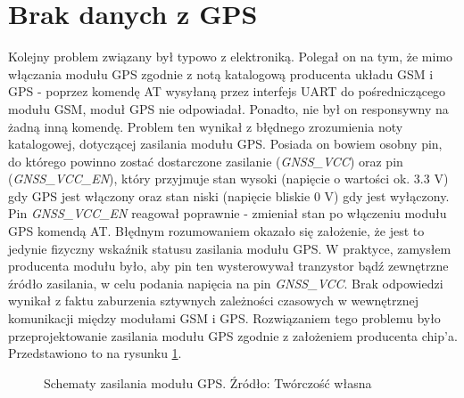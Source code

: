 \section{Brak danych z GPS}

Kolejny problem związany był typowo z elektroniką. Polegał on na tym, że mimo włączania modułu GPS zgodnie z notą katalogową producenta układu GSM i GPS - poprzez komendę AT wysyłaną przez interfejs UART do pośredniczącego modułu GSM, moduł GPS nie odpowiadał. Ponadto, nie był on responsywny na żadną inną komendę. Problem ten wynikał z błędnego zrozumienia noty katalogowej, dotyczącej zasilania modułu GPS. Posiada on bowiem osobny pin, do którego powinno zostać dostarczone zasilanie (\textit{GNSS\_VCC}) oraz pin (\textit{GNSS\_VCC\_EN}), który przyjmuje stan wysoki (napięcie o wartości ok. 3.3 V) gdy GPS jest włączony oraz stan niski (napięcie bliskie 0 V) gdy jest wyłączony. Pin \textit{GNSS\_VCC\_EN} reagował poprawnie - zmieniał stan po włączeniu modułu GPS komendą AT. Błędnym rozumowaniem okazało się założenie, że jest to jedynie fizyczny wskaźnik statusu zasilania modułu GPS. W praktyce, zamysłem producenta modułu było, aby pin ten wysterowywał tranzystor bądź zewnętrzne źródło zasilania, w celu podania napięcia na pin \textit{GNSS\_VCC}. Brak odpowiedzi wynikał z faktu zaburzenia sztywnych zależności czasowych w wewnętrznej komunikacji między modułami GSM i GPS. Rozwiązaniem tego problemu było przeprojektowanie zasilania modułu GPS zgodnie z założeniem producenta chip'a. Przedstawiono to na rysunku \ref{fig:image_mistake_gps_power}.

\begin{figure}[H]
\centering
	\qquad
	
	\caption{Schematy zasilania modułu GPS. Źródło: Twórczość własna}
	\label{fig:image_mistake_gps_power}
\end{figure}

